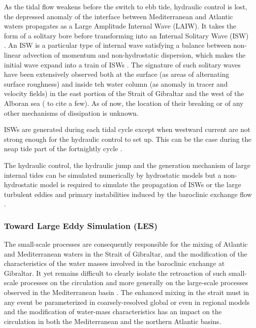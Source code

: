 As the tidal flow weakens before the switch to ebb tide, hydraulic control is lost, the depressed anomaly of the interface between Mediterranean and Atlantic waters propagates as a Large Amplitude Internal Wave (LAIW). It takes the form of a solitary bore before transforming into an Internal Solitary Wave (ISW) \citep{FA1988}. An ISW is a particular type of internal wave satisfying a balance between non-linear advection of momentum and non-hydrostatic dispersion, which makes the initial wave expand into a train of ISWs \citep{vlasenko_2000}. The signature of such solitary waves have been extensively observed both at the surface (as areas of alternating surface roughness) and inside teh water column (as anomaly in tracer and velocity fields) in the east portion of the Strait of Gibraltar and the west of the Alboran sea (\citet{ziegenbein_1970,FA1988,watson_1990,sanchezgarrido_2008} to cite a few). As of now, the location of their breaking or of any other mechanisms of dissipation is unknown.%

ISWs are generated during each tidal cycle except when westward current are not strong enough for the hydraulic control to set up. This can be the case during the neap tide part of the fortnightly cycle \citep{watson_1990}.

The hydraulic control, the hydraulic jump and the generation mechanism of large internal tides can be simulated numerically by hydrostatic models but a non-hydrostatic model is required to simulate the propagation of ISWs or the large turbulent eddies and primary instabilities induced by the baroclinic exchange flow \citep{brandt_1996,vlasenko_2009}.

\subsubsection{Toward Large Eddy Simulation (LES)}

The small-scale processes are consequently responsible for the mixing of Atlantic and Mediterranean waters in the Strait of Gibraltar, and the modification of the characteristics of the water masses involved in the baroclinic exchange at Gibraltar. It yet remains difficult to clearly isolate the retroaction of such small-scale processes on the circulation and more generally on the large-scale processes observed in the Mediterranean basin \citep{garcia-lafuente_2017}.
The enhanced mixing in the strait must in any event be parameterized in coarsely-resolved global or even in regional models and the modification of water-mass characteristics has an impact on the circulation in both the Mediterranean and the northern Atlantic basins. 

